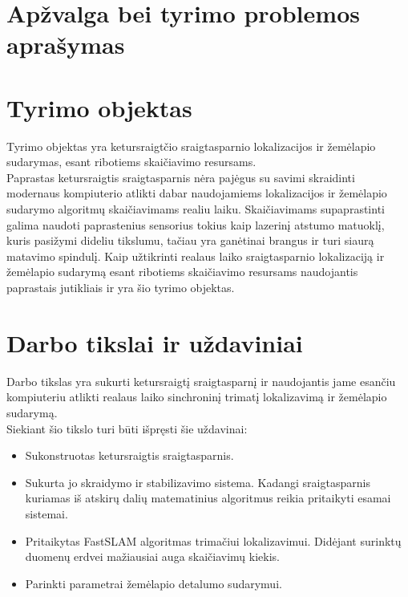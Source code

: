 \documentclass[a4paper, 12pt]{article} %
\begin{document}
\begin{onehalfspacing}

\section*{Ap\v{z}valga bei tyrimo problemos apra\v{s}ymas}

\section{Tyrimo objektas}

Tyrimo objektas yra ketursraigt\v{c}io sraigtasparnio lokalizacijos ir \v{z}em\.elapio sudarymas, esant ribotiems skai\v{c}iavimo resursams.
\\
\indent Paprastas ketursraigtis sraigtasparnis n\.era paj\.egus su savimi skraidinti modernaus kompiuterio atlikti dabar naudojamiems lokalizacijos ir \v{z}em\.elapio sudarymo algoritm\k{u} skai\v{c}iavimams realiu laiku. Skai\v{c}iavimams supaprastinti galima naudoti paprastenius sensorius tokius kaip lazerin\k{i} atstumo matuokl\k{i}, kuris pasi\v{z}ymi dideliu tikslumu, ta\v{c}iau yra gan\.{e}tinai brangus ir turi siaur\k{a} matavimo spindul\k{i}. Kaip u\v{z}tikrinti  realaus laiko sraigtasparnio lokalizacij\k{a} ir \v{z}em\.elapio sudarym\k{a} esant ribotiems skai\v{c}iavimo resursams naudojantis paprastais jutikliais ir yra \v{s}io tyrimo objektas. 

\section{Darbo tikslai ir u\v{z}daviniai}
Darbo tikslas yra sukurti ketursraigt\k{i} sraigtasparn\k{i} ir naudojantis jame esan\v{c}iu kompiuteriu atlikti realaus laiko sinchronin\k{i} trimat\k{i} lokalizavim\k{a} ir \v{z}em\.elapio sudarym\k{a}. 
\\
\indent Siekiant \v{s}io tikslo turi b\=uti i\v{s}pr\k{e}sti \v{s}ie u\v{z}davinai:
\begin{itemize}
\item Sukonstruotas ketursraigtis sraigtasparnis.  
\item Sukurta jo skraidymo ir stabilizavimo sistema. Kadangi sraigtasparnis kuriamas i\v{s} atskir\k{u} dali\k{u} matematinius algoritmus reikia pritaikyti esamai sistemai.
\item Pritaikytas FastSLAM algoritmas trima\v{c}iui lokalizavimui\cite{Zikos2011}. Did\.ejant surinkt\k{u} duomen\k{u} erdvei ma\v{z}iausiai auga skai\v{c}iavim\k{u} kiekis.
\item Parinkti parametrai \v{z}em\.elapio detalumo sudarymui.
\end{itemize}
     

\end{onehalfspacing}
\end{document}
